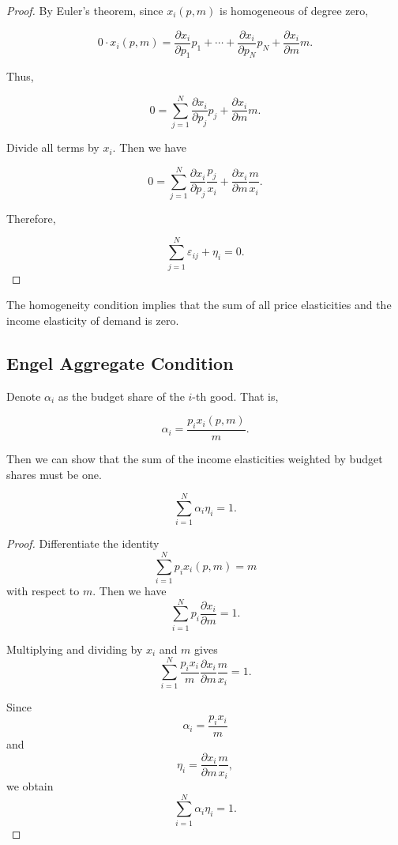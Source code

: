 \begin{proof}
By Euler's theorem, since \(x_i(p,m)\) is homogeneous of degree zero,

\[
0 \cdot x_i(p,m)
=
\frac{\partial x_i}{\partial p_1}p_1
+
\cdots
+
\frac{\partial x_i}{\partial p_N}p_N
+
\frac{\partial x_i}{\partial m}m.
\]

Thus,

\[
0
=
\sum_{j=1}^N
\frac{\partial x_i}{\partial p_j}p_j
+
\frac{\partial x_i}{\partial m}m.
\]

Divide all terms by \(x_i\). Then we have

\[
0
=
\sum_{j=1}^N
\frac{\partial x_i}{\partial p_j}
\frac{p_j}{x_i}
+
\frac{\partial x_i}{\partial m}
\frac{m}{x_i}.
\]

Therefore,

\[
\sum_{j=1}^N \varepsilon_{ij} + \eta_i = 0.
\]
\end{proof}

The homogeneity condition implies that the sum of all price elasticities and the income elasticity of demand is zero.

\subsection{Engel Aggregate Condition}

Denote \(\alpha_i\) as the budget share of the \(i\)-th good. That is,

\[
\alpha_i
=
\frac{p_i x_i(p,m)}{m}.
\]

Then we can show that the sum of the income elasticities weighted by budget shares must be one.

\begin{condition}
\[
\sum_{i=1}^N \alpha_i \eta_i = 1.
\]
\end{condition}



\begin{proof}
Differentiate the identity
\[
\sum_{i=1}^N p_i x_i(p,m)=m
\]
with respect to \(m\). Then we have
\[
\sum_{i=1}^N p_i \frac{\partial x_i}{\partial m}=1.
\]

Multiplying and dividing by \(x_i\) and \(m\) gives
\[
\sum_{i=1}^N
\frac{p_i x_i}{m}
\frac{\partial x_i}{\partial m}
\frac{m}{x_i}
=
1.
\]

Since
\[
\alpha_i
=
\frac{p_i x_i}{m}
\]
and
\[
\eta_i
=
\frac{\partial x_i}{\partial m}
\frac{m}{x_i},
\]
we obtain
\[
\sum_{i=1}^N \alpha_i \eta_i = 1.
\]
\end{proof}

